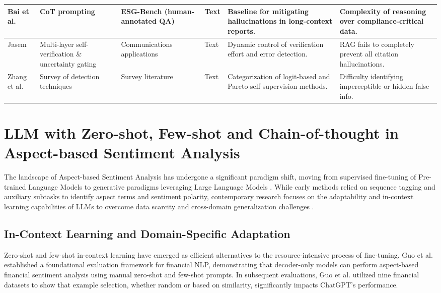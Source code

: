 \begin{landscape}
\begin{table}[p]
\begin{tabularx}{\linewidth}{|p{1.8cm}|X|X|p{1.8cm}|X|X|}
Bai et al.  \parencite{association_for_artificial_intelligence_2026_86e12eae} & CoT prompting & ESG-Bench (human-annotated QA) & Text & Baseline for mitigating hallucinations in long-context reports. & Complexity of reasoning over compliance-critical data. \\ \hline
Jasem  \parencite{al_noor_ali_aziz_jasem_af362154} & Multi-layer self-verification \& uncertainty gating & Communications applications & Text & Dynamic control of verification effort and error detection. & RAG fails to completely prevent all citation hallucinations. \\ \hline
Zhang et al.  \parencite{yue_zhang_9101e661} & Survey of detection techniques & Survey literature & Text & Categorization of logit-based and Pareto self-supervision methods. & Difficulty identifying imperceptible or hidden false info. \\ \hline
\end{tabularx}
\end{table}
\end{landscape}


\section{LLM with Zero-shot, Few-shot and Chain-of-thought in Aspect-based Sentiment Analysis}

The landscape of Aspect-based Sentiment Analysis has undergone a significant paradigm shift, moving from supervised fine-tuning of Pre-trained Language Models to generative paradigms leveraging Large Language Models  \parencite[]{chengyan_wu_4c659eab, zhiyuan_ma_3b2e6db4}. While early methods relied on sequence tagging and auxiliary subtasks to identify aspect terms and sentiment polarity, contemporary research focuses on the adaptability and in-context learning capabilities of LLMs to overcome data scarcity and cross-domain generalization challenges  \parencite[]{nils_constantin_hellwig_6fa4e097, jakob_fehle_a0e62c9d}.
\subsection{In-Context Learning and Domain-Specific Adaptation}

Zero-shot and few-shot in-context learning have emerged as efficient alternatives to the resource-intensive process of fine-tuning. Guo et al.  \parencite{yue_guo_642efc19} established a foundational evaluation framework for financial NLP, demonstrating that decoder-only models can perform aspect-based financial sentiment analysis using manual zero-shot and few-shot prompts. In subsequent evaluations, Guo et al.  \parencite{yue_guo_642efc19} utilized nine financial datasets to show that example selection, whether random or based on similarity, significantly impacts ChatGPT's performance.

